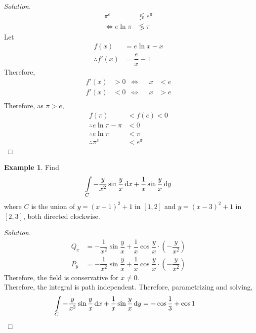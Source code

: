 \documentclass[fleqn, a4paper, 12pt]{article}
\theoremstyle{definition}
\newtheorem{example}{Example}
\theoremstyle{theorem}
\theoremstyle{remark}
\newenvironment{solution}
{\begin{proof}[Solution]\let\qed\relax}
	{\end{proof}}
\begin{document}
\begin{solution}
	\begin{align*}
		\pi^e &\lessgtr e^\pi\\
		\iff e \ln \pi &\lessgtr \pi
	\end{align*}
	Let
	\begin{align*}
		f(x) &= e \ln x - x\\
		\therefore f'(x) &= \dfrac{e}{x} - 1
	\end{align*}
	Therefore,
	\begin{align*}
		f'(x) &> 0 &\iff&& x &< e\\
		f'(x) &< 0 &\iff&& x &> e\\
	\end{align*}
	Therefore, as $\pi > e$,
	\begin{align*}
		f(\pi) &< f(e) < 0\\
		\therefore e \ln \pi - \pi  &< 0\\
		\therefore e \ln \pi &< \pi\\
		\therefore \pi^e &< e^\pi
	\end{align*}
\end{solution}

\begin{example}
	Find
	\begin{align*}
		\int\limits_{C} -\dfrac{y}{x^2} \sin \dfrac{y}{x} \dif x + \dfrac{1}{x} \sin \dfrac{y}{x} \dif y
	\end{align*}
	where $C$ is the union of $y = (x - 1)^2 + 1$ in $[1,2]$ and $y = (x - 3)^2 + 1$ in $[2,3]$, both directed clockwise.
\end{example}

\begin{solution}
	\begin{align*}
		Q_x &= -\dfrac{1}{x^2} \sin \dfrac{y}{x} + \dfrac{1}{x} \cos \dfrac{y}{x} \cdot \left( -\dfrac{y}{x^2} \right)\\
		P_y &= -\dfrac{1}{x^2} \sin \dfrac{y}{x} + \dfrac{1}{x} \cos \dfrac{y}{x} \cdot \left( -\dfrac{y}{x^2} \right)
	\end{align*}
	Therefore, the field is conservative for $x \neq 0$.\\
	Therefore, the integral is path independent. Therefore, parametrizing and solving,
	\begin{align*}
		\int\limits_{C} -\dfrac{y}{x^2} \sin \dfrac{y}{x} \dif x + \dfrac{1}{x} \sin \dfrac{y}{x} \dif y &= - \cos \dfrac{1}{3} + \cos 1
	\end{align*}
\end{solution}
\end{document}
